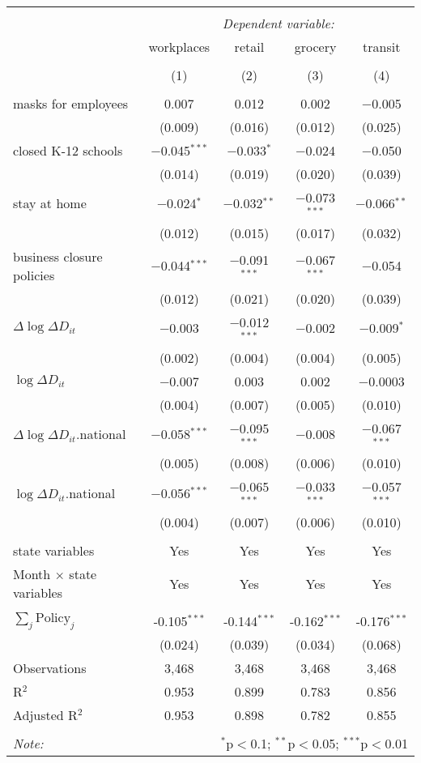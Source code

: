 \begin{tabular}{@{\extracolsep{1pt}}lcccc} 
\\[-1.8ex]\hline 
\hline \\[-1.8ex] 
 & \multicolumn{4}{c}{\textit{Dependent variable:}} \\ 
\cline{2-5} 
 & workplaces & retail & grocery & transit \\ 
\\[-1.8ex] & (1) & (2) & (3) & (4)\\ 
\hline \\[-1.8ex] 
 masks for employees & 0.007 & 0.012 & 0.002 & $-$0.005 \\ 
  & (0.009) & (0.016) & (0.012) & (0.025) \\ 
  closed K-12 schools & $-$0.045$^{***}$ & $-$0.033$^{*}$ & $-$0.024 & $-$0.050 \\ 
  & (0.014) & (0.019) & (0.020) & (0.039) \\ 
  stay at home & $-$0.024$^{*}$ & $-$0.032$^{**}$ & $-$0.073$^{***}$ & $-$0.066$^{**}$ \\ 
  & (0.012) & (0.015) & (0.017) & (0.032) \\ 
  business closure policies & $-$0.044$^{***}$ & $-$0.091$^{***}$ & $-$0.067$^{***}$ & $-$0.054 \\ 
  & (0.012) & (0.021) & (0.020) & (0.039) \\ 
  $\Delta \log \Delta D_{it}$ & $-$0.003 & $-$0.012$^{***}$ & $-$0.002 & $-$0.009$^{*}$ \\ 
  & (0.002) & (0.004) & (0.004) & (0.005) \\ 
  $\log \Delta D_{it}$ & $-$0.007 & 0.003 & 0.002 & $-$0.0003 \\ 
  & (0.004) & (0.007) & (0.005) & (0.010) \\ 
  $\Delta \log \Delta D_{it}$.national & $-$0.058$^{***}$ & $-$0.095$^{***}$ & $-$0.008 & $-$0.067$^{***}$ \\ 
  & (0.005) & (0.008) & (0.006) & (0.010) \\ 
  $\log \Delta D_{it}$.national & $-$0.056$^{***}$ & $-$0.065$^{***}$ & $-$0.033$^{***}$ & $-$0.057$^{***}$ \\ 
  & (0.004) & (0.007) & (0.006) & (0.010) \\ 
 \hline \\[-1.8ex] 
state variables & Yes & Yes & Yes & Yes \\ 
Month $\times$ state variables & Yes & Yes & Yes & Yes \\ 
\hline \\[-1.8ex] 
$\sum_j \mathrm{Policy}_j$ & -0.105$^{***}$ & -0.144$^{***}$ & -0.162$^{***}$ & -0.176$^{***}$ \\ 
 & (0.024) & (0.039) & (0.034) & (0.068) \\ 
Observations & 3,468 & 3,468 & 3,468 & 3,468 \\ 
R$^{2}$ & 0.953 & 0.899 & 0.783 & 0.856 \\ 
Adjusted R$^{2}$ & 0.953 & 0.898 & 0.782 & 0.855 \\ 
\hline 
\hline \\[-1.8ex] 
\textit{Note:}  & \multicolumn{4}{r}{$^{*}$p$<$0.1; $^{**}$p$<$0.05; $^{***}$p$<$0.01} \\ 
\end{tabular} 